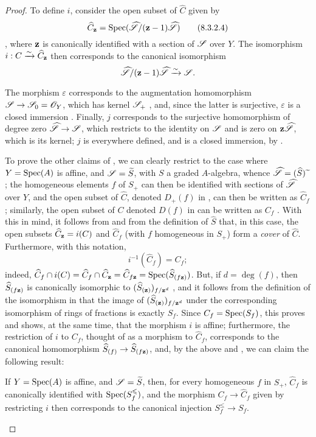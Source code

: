 \begin{proof}
To define $i$, consider the open subset of $\widehat{C}$ given by
\[
\label{II.8.3.2.4}
  \widehat{C}_{\mathbf{z}} = \operatorname{Spec}(\widehat{\mathscr{S}}/(\mathbf{z}-1)\widehat{\mathscr{S}})
\tag{8.3.2.4}
\]
, where $\mathbf{z}$ is canonically identified with a section of $\mathscr{S}$ over $Y$.
The isomorphism $i: C\xrightarrow{\sim}\widehat{C}_{\mathbf{z}}$ then corresponds to the canonical isomorphism 
\[
  \widehat{\mathscr{S}}/(\mathbf{z}-1)\widehat{\mathscr{S}} \xrightarrow{\sim} \mathscr{S}.
\]

The morphism $\varepsilon$ corresponds to the augmentation homomorphism $\sh{S}\to\sh{S}_0=\sh{O}_Y$, which has kernel $\mathscr{S}_+$ , and, since the latter is surjective, $\varepsilon$ is a closed immersion .
Finally, $j$ corresponds  to the surjective homomorphism of degree zero $\widehat{\sh{S}}\to\sh{S}$, which restricts to the identity on $\mathscr{S}$ and is zero on $\mathbf{z}\widehat{\mathscr{S}}$, which is its kernel;
$j$ is everywhere defined, and is a closed immersion, by .

To prove the other claims of , we can clearly restrict to the case where $Y=\operatorname{Spec}(A)$ is affine, and $\mathscr{S}=\widetilde{S}$, with $S$ a graded $A$-algebra, whence $\widehat{\mathscr{S}}=(\widehat{S}){\,\widetilde{\,}\,}$;
the homogeneous elements $f$ of $S_+$ can then be identified with sections of $\widehat{\mathscr{S}}$ over $Y$, and the open subset of $\widehat{C}$, denoted $D_+(f)$ in , can then be written as $\widehat{C}_f$ ;
similarly, the open subset of $C$ denoted $D(f)$ in  can be written as $C_f$ .
With this in mind, it follows from  and from the definition of $\widehat{S}$ that, in this case, the open subsets $\widehat{C}_{\mathbf{z}}=i(C)$ and $\widehat{C}_f$ (with $f$ homogeneous in $S_+$) form a \emph{cover} of $\widehat{C}$.
Furthermore, with this notation,
\[
\label{II.8.3.2.5}
  i^{-1}(\widehat{C}_f) = C_f;
\tag{8.3.2.5}
\]
indeed, $\widehat{C}_f\cap i(C) = \widehat{C}_f\cap\widehat{C}_{\mathbf{z}} = \widehat{C}_{f\mathbf{z}} = \operatorname{Spec}(\widehat{S}_{(f\mathbf{z})})$.
But, if $d=\deg(f)$, then $\widehat{S}_{(f\mathbf{z})}$ is canonically isomorphic to $(\widehat{S}_{(\mathbf{z})})_{f/\mathbf{z}^d}$ , and it follows from the definition of the isomorphism in  that the image of $(\widehat{S}_{(\mathbf{z})})_{f/\mathbf{z}^d}$ under the corresponding isomorphism of rings of fractions is exactly $S_f$.
Since $C_f=\operatorname{Spec}(S_f)$, this proves  and shows, at the same time, that the morphism $i$ is affine;
furthermore, the restriction of $i$ to $C_f$, thought of as a morphism to $\widehat{C}_f$, corresponds  to the canonical homomorphism $\widehat{S}_{(f)}\to\widehat{S}_{(f\bb{z})}$, and, by the above and , we can claim the following result:
\begin{env}[8.3.2.6]
\label{II.8.3.2.6}
If $Y=\operatorname{Spec}(A)$ is affine, and $\mathscr{S}=\widetilde{S}$, then, for every homogeneous $f$ in $S_+$, $\widehat{C}_f$ is canonically identified with $\operatorname{Spec}(S_f^\leqslant)$, and the morphism $C_f\to\widehat{C}_f$ given by restricting $i$ then corresponds to the canonical injection $S_f^\leq\to S_f$.
\end{env}


\end{proof}

